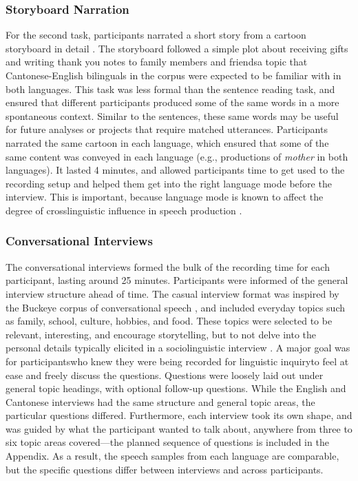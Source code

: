 \subsubsection{Storyboard Narration}\label{ch2:subsec:storyboard}
For the second task, participants narrated a short story from a cartoon storyboard in detail \citep{littell_2010_thank}. The storyboard followed a simple plot about receiving gifts and writing thank you notes to family members and friends\textemdash a topic that Cantonese-English bilinguals in the corpus were expected to be familiar with in both languages. This task was less formal than the sentence reading task, and ensured that different participants produced some of the same words in a more spontaneous context. Similar to the sentences, these same words may be useful for future analyses or projects that require matched utterances. Participants narrated the same cartoon in each language, which ensured that some of the same content was conveyed in each language (e.g., productions of \textit{mother} in both languages). It lasted 4 minutes, and allowed participants time to get used to the recording setup and helped them get into the right language mode before the interview. This is important, because language mode is known to affect the degree of crosslinguistic influence in speech production \citep{simonet_2019_convergence}.

\subsubsection{Conversational Interviews}\label{ch2:subsec:interview}
The conversational interviews formed the bulk of the recording time for each participant, lasting around 25 minutes. Participants were informed of the general interview structure ahead of time. The casual interview format was inspired by the Buckeye corpus of conversational speech \citep{pitt_2005_buckeye}, and included everyday topics such as family, school, culture, hobbies, and food. These topics were selected to be relevant, interesting, and encourage storytelling, but to not delve into the personal details typically elicited in a sociolinguistic interview \citep{nagy_2011_hlvc}. A major goal was for participants\textemdash who knew they were being recorded for linguistic inquiry\textemdash to feel at ease and freely discuss the questions. Questions were loosely laid out under general topic headings, with optional follow-up questions. While the English and Cantonese interviews had the same structure and general topic areas, the particular questions differed. Furthermore, each interview took its own shape, and was guided by what the participant wanted to talk about, anywhere from three to six topic areas covered---the planned sequence of questions is included in the Appendix. As a result, the speech samples from each language are comparable, but the specific questions differ between interviews and across participants. 

